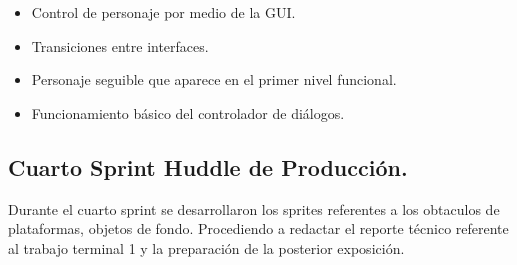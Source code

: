 \begin{itemize}
	\item Control de personaje por medio de la GUI.
	\item Transiciones entre interfaces.
	\item Personaje seguible que aparece en el primer nivel funcional.
	\item Funcionamiento básico del controlador de diálogos.
\end{itemize}

\subsection{Cuarto Sprint Huddle de Producción.}
Durante el cuarto sprint se desarrollaron los sprites referentes a los obtaculos 
de plataformas, objetos de fondo. Procediendo a redactar el reporte técnico 
referente al trabajo terminal 1 y la preparación de la posterior exposición.
